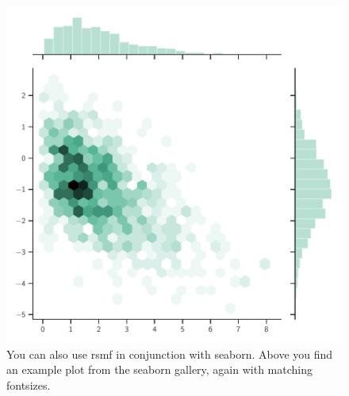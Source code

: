 \documentclass[a4paper,12pt]{quantumarticle}
\begin{document}
\begin{figure}
	\centering
	\includegraphics{hexbin}
	\caption{You can also use rsmf in conjunction with seaborn. Above you find an example plot from the seaborn gallery, again with matching fontsizes.}
\end{figure}

\lipsum[11-20]
    
\end{document}
